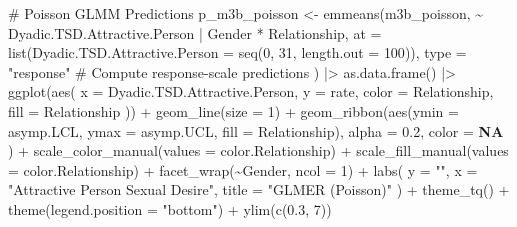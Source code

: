 \documentclass[
  bookmarksnumbered]{article}
\newenvironment{Shaded}{\begin{snugshade}}{\end{snugshade}}
\newcommand{\AttributeTok}[1]{\textcolor[rgb]{0.80,0.80,0.80}{#1}}
\newcommand{\CommentTok}[1]{\textcolor[rgb]{0.50,0.62,0.50}{#1}}
\newcommand{\ConstantTok}[1]{\textcolor[rgb]{0.86,0.64,0.64}{\textbf{#1}}}
\newcommand{\DecValTok}[1]{\textcolor[rgb]{0.86,0.86,0.80}{#1}}
\newcommand{\FloatTok}[1]{\textcolor[rgb]{0.75,0.75,0.82}{#1}}
\newcommand{\FunctionTok}[1]{\textcolor[rgb]{0.94,0.94,0.56}{#1}}
\newcommand{\NormalTok}[1]{\textcolor[rgb]{0.80,0.80,0.80}{#1}}
\newcommand{\OtherTok}[1]{\textcolor[rgb]{0.94,0.94,0.56}{#1}}
\newcommand{\SpecialCharTok}[1]{\textcolor[rgb]{0.86,0.64,0.64}{#1}}
\newcommand{\StringTok}[1]{\textcolor[rgb]{0.80,0.58,0.58}{#1}}
\begin{document}
\begin{Shaded}
\begin{Highlighting}[]
\CommentTok{\# Poisson GLMM Predictions}
\NormalTok{p\_m3b\_poisson }\OtherTok{\textless{}{-}} \FunctionTok{emmeans}\NormalTok{(m3b\_poisson, }\SpecialCharTok{\textasciitilde{}}\NormalTok{ Dyadic.TSD.Attractive.Person }\SpecialCharTok{|}\NormalTok{ Gender }\SpecialCharTok{*}\NormalTok{ Relationship,}
  \AttributeTok{at =} \FunctionTok{list}\NormalTok{(}\AttributeTok{Dyadic.TSD.Attractive.Person =} \FunctionTok{seq}\NormalTok{(}\DecValTok{0}\NormalTok{, }\DecValTok{31}\NormalTok{, }\AttributeTok{length.out =} \DecValTok{100}\NormalTok{)),}
  \AttributeTok{type =} \StringTok{"response"} \CommentTok{\# Compute response{-}scale predictions}
\NormalTok{) }\SpecialCharTok{|\textgreater{}}
  \FunctionTok{as.data.frame}\NormalTok{() }\SpecialCharTok{|\textgreater{}}
  \FunctionTok{ggplot}\NormalTok{(}\FunctionTok{aes}\NormalTok{(}
    \AttributeTok{x =}\NormalTok{ Dyadic.TSD.Attractive.Person, }\AttributeTok{y =}\NormalTok{ rate,}
    \AttributeTok{color =}\NormalTok{ Relationship, }\AttributeTok{fill =}\NormalTok{ Relationship}
\NormalTok{  )) }\SpecialCharTok{+}
  \FunctionTok{geom\_line}\NormalTok{(}\AttributeTok{size =} \DecValTok{1}\NormalTok{) }\SpecialCharTok{+}
  \FunctionTok{geom\_ribbon}\NormalTok{(}\FunctionTok{aes}\NormalTok{(}\AttributeTok{ymin =}\NormalTok{ asymp.LCL, }\AttributeTok{ymax =}\NormalTok{ asymp.UCL, }\AttributeTok{fill =}\NormalTok{ Relationship),}
    \AttributeTok{alpha =} \FloatTok{0.2}\NormalTok{, }\AttributeTok{color =} \ConstantTok{NA}
\NormalTok{  ) }\SpecialCharTok{+}
  \FunctionTok{scale\_color\_manual}\NormalTok{(}\AttributeTok{values =}\NormalTok{ color.Relationship) }\SpecialCharTok{+}
  \FunctionTok{scale\_fill\_manual}\NormalTok{(}\AttributeTok{values =}\NormalTok{ color.Relationship) }\SpecialCharTok{+}
  \FunctionTok{facet\_wrap}\NormalTok{(}\SpecialCharTok{\textasciitilde{}}\NormalTok{Gender, }\AttributeTok{ncol =} \DecValTok{1}\NormalTok{) }\SpecialCharTok{+}
  \FunctionTok{labs}\NormalTok{(}
    \AttributeTok{y =} \StringTok{""}\NormalTok{, }\AttributeTok{x =} \StringTok{"Attractive Person Sexual Desire"}\NormalTok{,}
    \AttributeTok{title =} \StringTok{"GLMER (Poisson)"}
\NormalTok{  ) }\SpecialCharTok{+}
  \FunctionTok{theme\_tq}\NormalTok{() }\SpecialCharTok{+}
  \FunctionTok{theme}\NormalTok{(}\AttributeTok{legend.position =} \StringTok{"bottom"}\NormalTok{) }\SpecialCharTok{+}
  \FunctionTok{ylim}\NormalTok{(}\FunctionTok{c}\NormalTok{(}\FloatTok{0.3}\NormalTok{, }\DecValTok{7}\NormalTok{))}


\end{Highlighting}
\end{Shaded}
\end{document}
